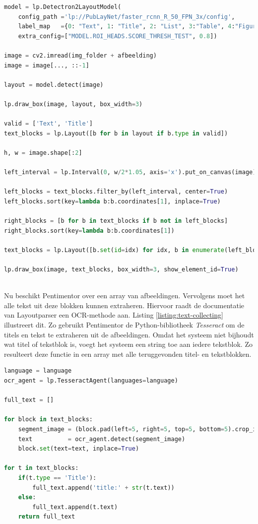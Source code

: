 \begin{lstlisting}[language=Python, caption={Een PDF inlezen met OCR}, label={code:reader-ocr}]
model = lp.Detectron2LayoutModel(
	config_path ='lp://PubLayNet/faster_rcnn_R_50_FPN_3x/config',
	label_map   ={0: "Text", 1: "Title", 2: "List", 3:"Table", 4:"Figure"}, 
	extra_config=["MODEL.ROI_HEADS.SCORE_THRESH_TEST", 0.8])

image = cv2.imread(img_folder + afbeelding)
image = image[..., ::-1]
	
layout = model.detect(image)
	
lp.draw_box(image, layout, box_width=3)
	
valid = ['Text', 'Title']
text_blocks = lp.Layout([b for b in layout if b.type in valid])
	
h, w = image.shape[:2]
	
left_interval = lp.Interval(0, w/2*1.05, axis='x').put_on_canvas(image)
	
left_blocks = text_blocks.filter_by(left_interval, center=True)
left_blocks.sort(key=lambda b:b.coordinates[1], inplace=True)
	
right_blocks = [b for b in text_blocks if b not in left_blocks]
right_blocks.sort(key=lambda b:b.coordinates[1])
	
text_blocks = lp.Layout([b.set(id=idx) for idx, b in enumerate(left_blocks+right_blocks)])
	
lp.draw_box(image, text_blocks, box_width=3, show_element_id=True)
	
\end{lstlisting}

Nu beschikt Pentimentor over een array van afbeeldingen. Vervolgens moet het alle tekst uit deze blokken kunnen extraheren. Hiervoor raadt de documentatie van Layoutparser een OCR-methode aan. Listing \ref{listing:text-collecting} illustreert dit. Zo gebruikt Pentimentor de Python-bibliotheek \textit{Tesseract} om de titels en tekst te extraheren uit de afbeeldingen. Omdat het systeem niet bijhoudt wat titel of tekstblok is, voegt het systeem een string toe aan iedere tekstblok. Zo resulteert deze functie in een array met alle teruggevonden titel- en tekstblokken.

\begin{lstlisting}[language=Python, caption={Tekst extraheren uit de geparsete inhoud.}, label={listing:text-collecting}]
language = language
ocr_agent = lp.TesseractAgent(languages=language)

full_text = []
	
for block in text_blocks:
	segment_image = (block.pad(left=5, right=5, top=5, bottom=5).crop_image(image))
	text          = ocr_agent.detect(segment_image)
	block.set(text=text, inplace=True)
	
for t in text_blocks:
	if(t.type == 'Title'):
		full_text.append('title:' + str(t.text))
	else:
		full_text.append(t.text)    
	return full_text
\end{lstlisting}

